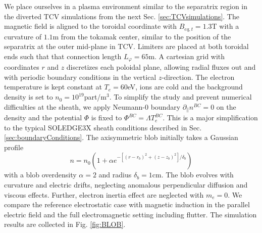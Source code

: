 We place ourselves in a plasma environment similar to the separatrix region in the diverted TCV simulations from the next Sec. \ref{sec:TCVsimulations}. The magnetic field is aligned to the toroidal coordinate with $B_{eq,t} = 1.3$T with a curvature of $1.1$m from the tokamak center, similar to the position of the separatrix at the outer mid-plane in TCV. Limiters are placed at both toroidal ends such that that connection length $L_\varphi = 65$m. A cartesian grid with coordinates $r$ and $z$ discretizes each poloidal plane, allowing radial fluxes out and with periodic boundary conditions in the vertical $z$-direction. The electron temperature is kept constant at $T_e=60$eV, ions are cold and the background density is set to $n_0 = 10^{19}$part/m$^3$. To simplify the study and prevent numerical difficulties at the sheath, we apply Neumann-0 boundary $\partial_\parallel n^{BC} = 0$ on the density and the potential $\Phi$ is fixed to $\Phi^{BC} = \Lambda T_e^{BC}$. This is a major simplification to the typical SOLEDGE3X sheath conditions described in Sec. \ref{sec:boundaryConditions}. The axisymmetric blob initially takes a Gaussian profile 
\begin{equation}
	n = n_0 \left(1 + \alpha e^{-\left[(r-r_b)^2+(z-z_b)^2\right]/\delta_b}\right)
	\label{eq:blobInitProfile}
\end{equation}
with a blob overdensity $\alpha = 2$ and radius $\delta_b = 1$cm. The blob evolves with curvature and electric drifts, neglecting anomalous perpendicular diffusion and viscous effects. Further, electron inertia effect are neglected with $m_e = 0$. We compare the reference electrostatic case with magnetic induction in the parallel electric field and the full electromagnetic setting including flutter. The simulation results are collected in Fig. \ref{fig:BLOB}. \newline

